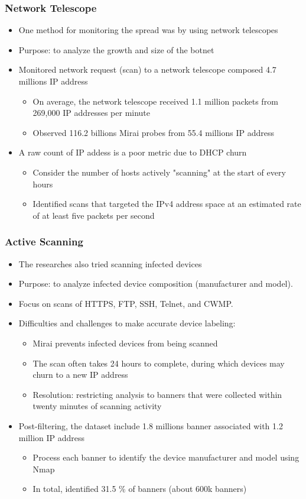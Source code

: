 \documentclass{beamer}
\begin{document}
\begin{frame}
	\frametitle{Network Telescope}
	\begin{itemize}
		\item<+-> One method for monitoring the spread was by using network telescopes
		\item<+-> Purpose: to analyze the growth and size of the botnet
		\item<+-> Monitored network request (scan) to a network telescope composed 4.7 millions IP address
		\begin{itemize}
			\item<+-> On average, the network telescope received 1.1 million packets from 269,000 IP addresses per minute 
			\item<+-> Observed 116.2 billions Mirai probes from 55.4 millions IP address
		\end{itemize}
		\item<+-> A raw count of IP addess is a poor metric due to DHCP churn
		\begin{itemize}
			\item<+-> Consider the number of hosts actively "scanning" at the start of every hours
			\item<+-> Identified scans that targeted the IPv4 address space at an estimated rate of at least five packets per second
		\end{itemize}
	\end{itemize}
\end{frame}

\begin{frame}
	\frametitle{Active Scanning}
	\begin{itemize}
		\item<+-> The researches also tried scanning infected devices
		\item<+-> Purpose: to analyze infected device composition (manufacturer and model).
		\item<+-> Focus on scans of HTTPS, FTP, SSH, Telnet, and CWMP.
		\item<+-> Difficulties and challenges to make accurate device labeling:		
		\begin{itemize}
			\item<+-> Mirai prevents infected devices from being scanned
			\item<+-> The scan often takes 24 hours to complete, during which devices may churn to a new IP address
			\item<+-> Resolution: restricting analysis to banners that were collected within twenty minutes of scanning activity
		\end{itemize}
		\item<+-> Post-filtering, the dataset include 1.8 millions banner associated with 1.2 million IP address
		\begin{itemize}
			\item<+-> Process each banner to identify the device manufacturer and model using Nmap
			\item<+-> In total, identified 31.5 \% of banners (about 600k banners)
		\end{itemize}
	\end{itemize}
\end{frame}
\end{document}
